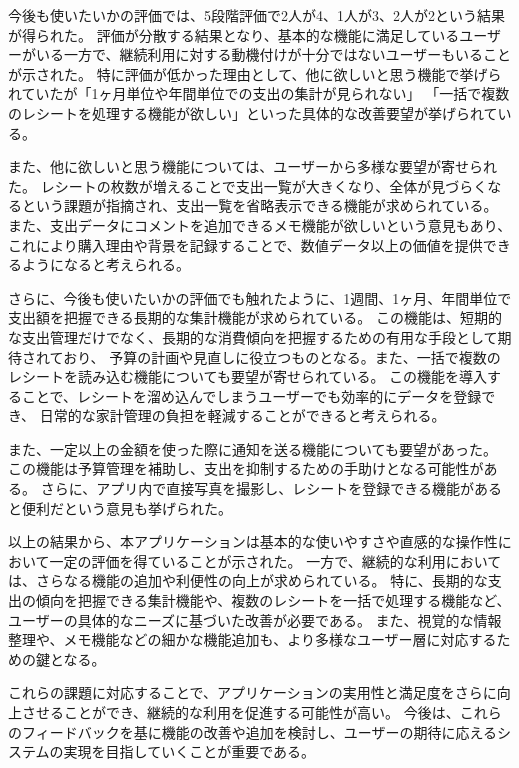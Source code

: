 \documentclass[main]{subfiles}
\begin{document}
今後も使いたいかの評価では、5段階評価で2人が4、1人が3、2人が2という結果が得られた。
評価が分散する結果となり、基本的な機能に満足しているユーザーがいる一方で、継続利用に対する動機付けが十分ではないユーザーもいることが示された。
特に評価が低かった理由として、他に欲しいと思う機能で挙げられていたが「1ヶ月単位や年間単位での支出の集計が見られない」
「一括で複数のレシートを処理する機能が欲しい」といった具体的な改善要望が挙げられている。

また、他に欲しいと思う機能については、ユーザーから多様な要望が寄せられた。
レシートの枚数が増えることで支出一覧が大きくなり、全体が見づらくなるという課題が指摘され、支出一覧を省略表示できる機能が求められている。
また、支出データにコメントを追加できるメモ機能が欲しいという意見もあり、
これにより購入理由や背景を記録することで、数値データ以上の価値を提供できるようになると考えられる。

さらに、今後も使いたいかの評価でも触れたように、1週間、1ヶ月、年間単位で支出額を把握できる長期的な集計機能が求められている。
この機能は、短期的な支出管理だけでなく、長期的な消費傾向を把握するための有用な手段として期待されており、
予算の計画や見直しに役立つものとなる。また、一括で複数のレシートを読み込む機能についても要望が寄せられている。
この機能を導入することで、レシートを溜め込んでしまうユーザーでも効率的にデータを登録でき、
日常的な家計管理の負担を軽減することができると考えられる。

また、一定以上の金額を使った際に通知を送る機能についても要望があった。
この機能は予算管理を補助し、支出を抑制するための手助けとなる可能性がある。
さらに、アプリ内で直接写真を撮影し、レシートを登録できる機能があると便利だという意見も挙げられた。

以上の結果から、本アプリケーションは基本的な使いやすさや直感的な操作性において一定の評価を得ていることが示された。
一方で、継続的な利用においては、さらなる機能の追加や利便性の向上が求められている。
特に、長期的な支出の傾向を把握できる集計機能や、複数のレシートを一括で処理する機能など、ユーザーの具体的なニーズに基づいた改善が必要である。
また、視覚的な情報整理や、メモ機能などの細かな機能追加も、より多様なユーザー層に対応するための鍵となる。

これらの課題に対応することで、アプリケーションの実用性と満足度をさらに向上させることができ、継続的な利用を促進する可能性が高い。
今後は、これらのフィードバックを基に機能の改善や追加を検討し、ユーザーの期待に応えるシステムの実現を目指していくことが重要である。
\end{document}
